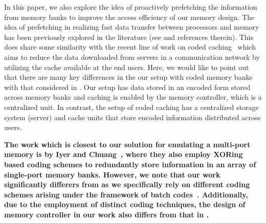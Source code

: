 In this paper, we also explore the idea of proactively prefetching the information from memory banks to improve the access efficiency of our memory design. The idea of prefetching in realizing fast data transfer between processors and memory has been previously explored in the literature (see \cite{Kim2016, Kadjo2014, Shevgoor2015, JL2013} and references therein). 
This does share some similarity with the recent line of work on coded caching~\cite{MN16a} which aims to reduce the data downloaded from servers in a communication network by utilizing the cache available at the end users. Here, we would like to point out that there are many key differences in the our setup with coded memory banks with that considered in \cite{MN16a}. Our setup has data stored in an encoded form stored across memory banks and caching is enabled by the memory controller, which is a centralized unit. In contrast, the setup of coded caching has a centralized storage system (server) and cache units that store encoded information distributed across users.

{\color{red} {\bf The work which is closest to our solution for emulating a multi-port memory is by Iyer and Chuang~\cite{Memoir_xor, Memoir_xor_virtual}, where they also employ XORing based coding schemes to redundantly store information in an array of single-port memory banks. However, we note that our work significantly differers from \cite{Memoir_xor, Memoir_xor_virtual} as we specifically rely on different coding schemes arising under the framework of batch codes~\cite{batchcodes}. Additionally, due to the employment of distinct coding techniques, the design of memory controller in our work also differs from that in \cite{Memoir_xor, Memoir_xor_virtual}.}}


